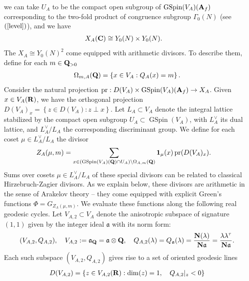 \documentclass{amsart}
\theoremstyle{definition}
\begin{document}
we can take $U_A$ to be the compact open subgroup of $\operatorname{GSpin}(V_A)({\bf{A}}_f)$ 
corresponding to the two-fold product of congruence subgroup $\Gamma_0(N)$ (see $(\ref{level})$), and we have 
\begin{align*} X_A({\bf{C}}) &\cong Y_0(N) \times Y_0(N). \end{align*}
The $X_A \cong Y_0(N)^2$ come equipped with arithmetic divisors. To describe them, define for each $m \in {\bf{Q}}_{>0}$  
\begin{align*} \Omega_{m, A}({\bf{Q}}) = \left\lbrace x \in V_A: Q_A(x) =m \right\rbrace. \end{align*}
Consider the natural projection 
$\operatorname{pr}: D(V_A) \times \operatorname{GSpin}(V_A)({\bf{A}}_f) \rightarrow X_A$.
Given $x \in V_A({\bf{R}})$, we have the orthogonal projection 
$D(V_A)_x = \left\lbrace z \in D(V_A): z \perp x \right\rbrace$.
Let $L_A \subset V_A$ denote the integral lattice stabilized by the compact open subgroup 
$U_A \subset \operatorname{GSpin}(V_A)$, with $L_A^{\vee}$ its dual lattice,
and $L_A^{\vee}/L_A$ the corresponding discriminant group.
We define for each coset $\mu \in L_A^{\vee}/L_A$ the divisor 
\begin{align*} Z_A(\mu, m) &= \sum\limits_{x \in \left( \operatorname{GSpin}(V_A)({\bf{Q}}) \cap U_A \right) 
\backslash \Omega_{A, m}({\bf{Q}})} {\bf{1}}_{\mu}(x) \operatorname{pr}(D(V_A)_x). \end{align*} 
Sums over cosets $\mu \in L_A^{\vee}/L_A$ of these special divisors can be related to classical Hirzebruch-Zagier divisors. 
As we explain below, these divisors are arithmetic in the sense of Arakelov theory -- they come equipped with 
explicit Green's functions $\Phi = G_{Z_A(\mu, m)}$. We evaluate these functions along the following real geodesic cycles. 
Let $V_{A, 2} \subset V_A$ denote the anisotropic subspace of signature 
$(1, 1)$ given by the integer ideal $\mathfrak{a}$ with its norm form:
\begin{align*} (V_{A, 2}, Q_{A, 2}), \quad V_{A, 2} := \mathfrak{a}_{\bf{Q}} = \mathfrak{a} \otimes {\bf{Q}}, 
\quad Q_{A,2}(\lambda) = Q_{\mathfrak{a}}(\lambda) = \frac{ {\bf{N}}(\lambda) }{ {\bf{N}} \mathfrak{a} } = \frac{\lambda \lambda^{\tau}}{ {\bf{N}} \mathfrak{a}  }. \end{align*}
Each such subspace $(V_{A, 2}, Q_{A, 2})$ gives rise to a set of oriented geodesic lines 
\begin{align*} D(V_{A, 2}) = \left\lbrace z \in V_{A, 2}({\bf{R}}) : \dim(z) = 1,~~~ Q_{A,2} \vert_z <0 \right\rbrace \end{align*}
\end{document}
